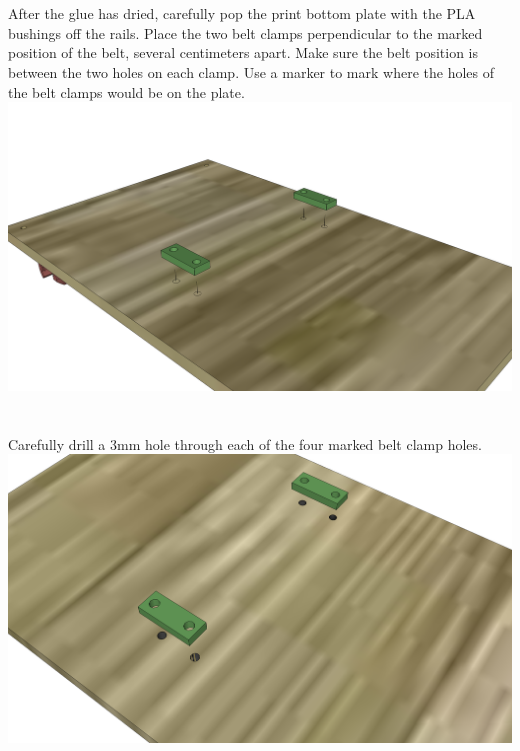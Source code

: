 \documentclass[twoside,openany,a4paper,titlepage]{memoir}
\begin{document}
	\section{}
	After the glue has dried, carefully pop the print bottom plate with the PLA bushings off the rails. Place
	the two belt clamps perpendicular to the marked position of the belt, several centimeters apart. Make
	sure the belt position is between the two holes on each clamp. Use a marker to mark where the holes of
	the belt clamps would be on the plate.\\
	\includegraphics[width=1\linewidth]{graphics/ch6_21.png}
	
	\section{}
	Carefully drill a 3mm hole through each of the four marked belt clamp holes.\\
	\includegraphics[width=1\linewidth]{graphics/ch6_22.png}
	
\end{document}
